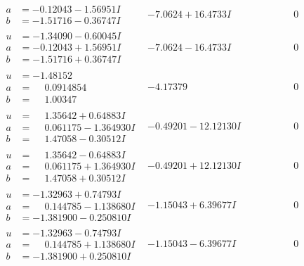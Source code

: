 \documentclass[1p]{elsarticle_modified}
\theoremstyle{definition}
\begin{document}
$$\begin{array}{c|c|c}
\begin{aligned}
a &= -0.12043 - 1.56951 I \\
b &= -1.51716 - 0.36747 I\end{aligned}
 & -7.0624 + 16.4733 I & \phantom{-0.000000 } 0 \\ \hline\begin{aligned}
u &= -1.34090 - 0.60045 I \\
a &= -0.12043 + 1.56951 I \\
b &= -1.51716 + 0.36747 I\end{aligned}
 & -7.0624 - 16.4733 I & \phantom{-0.000000 } 0 \\ \hline\begin{aligned}
u &= -1.48152\phantom{ +0.000000I} \\
a &= \phantom{-}0.0914854\phantom{ +0.000000I} \\
b &= \phantom{-}1.00347\phantom{ +0.000000I}\end{aligned}
 & -4.17379\phantom{ +0.000000I} & \phantom{-0.000000 } 0 \\ \hline\begin{aligned}
u &= \phantom{-}1.35642 + 0.64883 I \\
a &= \phantom{-}0.061175 - 1.364930 I \\
b &= \phantom{-}1.47058 - 0.30512 I\end{aligned}
 & -0.49201 - 12.12130 I & \phantom{-0.000000 } 0 \\ \hline\begin{aligned}
u &= \phantom{-}1.35642 - 0.64883 I \\
a &= \phantom{-}0.061175 + 1.364930 I \\
b &= \phantom{-}1.47058 + 0.30512 I\end{aligned}
 & -0.49201 + 12.12130 I & \phantom{-0.000000 } 0 \\ \hline\begin{aligned}
u &= -1.32963 + 0.74793 I \\
a &= \phantom{-}0.144785 - 1.138680 I \\
b &= -1.381900 - 0.250810 I\end{aligned}
 & -1.15043 + 6.39677 I & \phantom{-0.000000 } 0 \\ \hline\begin{aligned}
u &= -1.32963 - 0.74793 I \\
a &= \phantom{-}0.144785 + 1.138680 I \\
b &= -1.381900 + 0.250810 I\end{aligned}
 & -1.15043 - 6.39677 I & \phantom{-0.000000 } 0 \\ \hline\begin{aligned}

\end{aligned}
\end{array}$$
\end{document}
